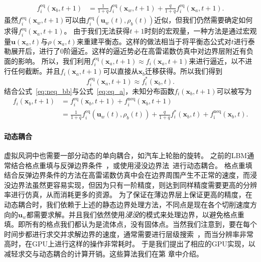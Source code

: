 \begin{align}
f^\text{eq}_i(\bm{x}_b, t\!+\!1) &= \frac{1}{1+q}f^\text{eq}_{i}(\bm{x}_w, t\!+\!1) + \frac{q}{1+q}f^\text{eq}_{i}(\bm{x}_a, t\!+\!1).
\end{align}
虽然$f^\text{eq}_{i}(\bm{x}_w, t\!+\!1)$可以由$f_{i}^\text{eq}(\bm{u}_w(t), \rho_b(t))$近似，但我们仍然需要确定如何求得$f^\text{eq}_{i}(\bm{x}_a, t\!+\!1)$。
由于我们无法获得$t+1$时刻的宏观量，一种方法是通过宏观量$\bm{u}(\bm{x}_a, t)$与$\rho(\bm{x}_a, t)$来重建平衡态。这样的做法相当于将平衡态公式对$t$进行泰勒展开后，进行了0阶逼近。这样的逼近势必在高雷诺数仿真中对边界层附近有负面的影响。
所以，我们利用$f^\text{eq}_{i}(\bm{x}_a, t\!+\!1) \approx f_{i}(\bm{x}_a, t\!+\!1)$来进行逼近，以不进行任何截断。并且$f_{i}(\bm{x}_a, t\!+\!1)$可以直接从$\bm{x}_b$迁移获得。所以我们得到
\begin{equation}
\label{eq:eq_a}
f^\text{eq}_{i}(\bm{x}_a, t\!+\!1) \approx f^{*}_{i}(\bm{x}_b, t).
\end{equation}
结合公式~\ref{eq:neq_bb}与公式~\ref{eq:eq_a}，未知分布函数$f_i(\bm{x}_b, t\!+\!1)$可以被写为
\begin{align}
f_i(\bm{x}_b, t\!+\!1) &= f^\text{eq}_i(\bm{x}_b, t\!+\!1) + f^\text{neq}_{i}(\bm{x}_b, t\!+\!1) \\
&= \frac{1}{1\!+\!q}f_{i}^\text{eq}(\bm{u}_w(t), \rho_b(t)) + \frac{q}{1\!+\!q}f^{*}_{i}(\bm{x}_b, t) + f^\text{neq}_{\bar{\imath}}(\bm{x}_b, t).\nonumber
\end{align}

\paragraph{动态耦合}
虚拟风洞中也需要一部分动态的单向耦合，如汽车上轮胎的旋转。
之前的LBM通常结合格点重填与反弹边界条件~\cite{Tao-2016}，或使用浸没边界法~\cite{Li-2016, Li-2020}进行动态耦合。
格点重填结合反弹边界条件的方法在高雷诺数仿真中会在边界周围产生不正常的速度，而浸没边界法虽然更容易实现，但因为只有一阶精度，则达到同样精度需要更高的分辨率进行仿真，从而消耗更多的资源。
为了保证在薄边界层上保证更高的精度，在动态耦合时，我们依赖于上述的静态边界处理方法，不同点是现在各个切削速度方向的$\bm{u}_w$都需要求解。并且我们依然使用\emph{浸没}的模式来处理边界，以避免格点重填。即所有的格点我们都认为是流体点，没有固体点。当然我们注意到，要在每个时间步都进行求交并求解边界的速度，通常需要进行层级搜索~\cite{Karras-2012}，而当分辨率非常高时，在GPU上进行这样的操作非常耗时。
于是我们提出了相应的GPU实现，以减轻求交与动态耦合的计算开销。这些算法我们在第  章中介绍。

